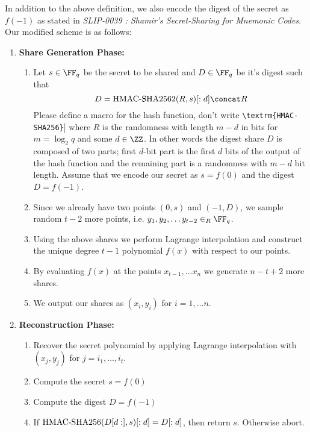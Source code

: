 \documentclass[envcountsame,runningheads,notitlepage]{llncs}
\DeclareRobustCommand{\michals}[2] {{\color{magenta}{$\big[$\scriptsize\textsf{Michal #1:}} #2$\big]$}}
\begin{document}
	In addition to the above definition, we also encode the digest of the secret as $f(-1)$ as stated in \emph{SLIP-0039 : Shamir's Secret-Sharing for Mnemonic Codes}. Our modified scheme is as follows:
	\begin{enumerate}
		\item \textbf{Share Generation Phase:}  
		\begin{enumerate}
			\item Let $s \in \FF_q$ be the secret to be shared and $D \in \FF_q$ be it's digest such that 
			\begin{equation*}
			D = \hsha2(R,s)[:d] \concat R
			\end{equation*} 
			\michals{13.03}{Please define a macro for the hash function, don't write \texttt{\textbackslash textrm\{HMAC-SHA256\}}}
			where $R$ is the randomness with length $m - d$ in bits for $m = \log_{2}{q}$ and some $d \in \ZZ$. In other words the digest share $D$ is composed of two parts; first $d$-bit part is the first $d$ bits of the output of the hash function and the remaining part is a randomness with $m - d$ bit length. Assume that we encode our secret as $s = f(0)$ and the digest $D = f(-1)$.
			\item Since we already have two points $(0, s)$ and $(-1, D)$, we sample random $t-2$ more points, i.e. $y_{1}, y_{2}, \ldots y_{t-2} \in_{R} \FF_q$.
			\item Using the above shares we perform Lagrange interpolation and construct the unique degree $t - 1$ polynomial $f (x)$ with respect to our points.  
			\item By evaluating $f (x)$ at the points $x_{t - 1}, \ldots x_{n}$ we generate $n - t + 2$ more shares.
			\item We output our shares as $(x_{i},y_{i})$ for $i = 1, \ldots n$.
		\end{enumerate}
		\item \textbf{Reconstruction Phase:}  
		\begin{enumerate}
			\item Recover the secret polynomial by applying Lagrange interpolation with $(x_{j}, y_{j})$ for $j = i_{1}, \ldots, i_{t}$.
			\item Compute the secret $s = f(0)$
			\item Compute the digest $D = f(-1)$
			\item If ${\textrm{HMAC-SHA256}}(D[d:],s)[:d] = D[:d]$, then return $s$. Otherwise abort. 
		\end{enumerate}
	\end{enumerate}
	
\end{document}
